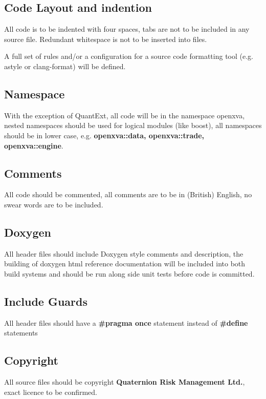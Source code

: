 \documentclass[12pt, a4paper]{article}
\begin{document}
\subsection*{Code Layout and indention}
All code is to be indented with four spaces, tabs are not to be included in any source file. Redundant whitespace is not to be inserted into files. 

\noindent
A full set of rules and/or a configuration for a source code formatting tool (e.g. astyle or clang-format) will be defined.

\subsection*{Namespace}
With the exception of QuantExt, all code will be in the namespace openxva, nested namespaces should be used for logical modules (like boost), all namespaces should be in lower case, e.g. \textbf{openxva::data, openxva::trade, openxva::engine}.

\subsection*{Comments}
All code should be commented, all comments are to be in (British) English, no swear words are to be included.

\subsection*{Doxygen}
All header files should include Doxygen style comments and description, the building of doxygen html reference documentation will be included into both build systems and should be run along side unit tests before code is committed.

\subsection*{Include Guards}
All header files should have a \textbf{\#pragma once} statement instead of \textbf{\#define} statements

\subsection*{Copyright}
All source files should be copyright \textbf{Quaternion Risk Management Ltd.}, exact licence to be confirmed.
\end{document}
